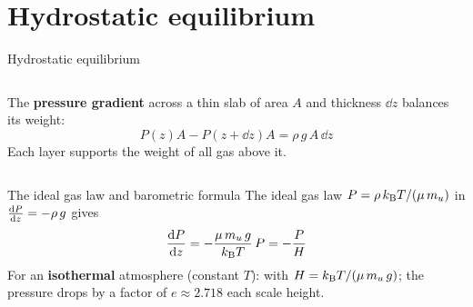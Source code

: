 \documentclass[aspectratio=169, 11pt]{beamer}
\begin{document}
\section{Hydrostatic equilibrium}

\begin{frame}{Hydrostatic equilibrium}
  \begin{columns}[c]
    \column{\recapfigcol}

    \column{\recaptextcol}
    \small
    The \textbf{pressure gradient} across a thin slab of area $A$ and thickness $\dd z$ balances its weight:
    $$P(z)A - P(z + \dd z)A = \rho\,g\,A\,\dd z$$
    \vskip4pt
    \vskip4pt
    Each layer supports the weight of all gas above it.
  \end{columns}
\end{frame}

\begin{frame}{The ideal gas law and barometric formula}
  The ideal gas law $P = \rho\,k_{\mathrm{B}} T / (\mu\,m_u)$ in $\frac{\mathrm{d} P}{\mathrm{d} z} = -\rho\,g$ gives
  $$\frac{\mathrm{d} P}{\mathrm{d} z} = -\frac{\mu\,m_u\,g}{k_{\mathrm{B}} T}\,P = -\frac{P}{H}$$
  \vskip4pt
  For an \textbf{isothermal} atmosphere (constant $T$):
  \vskip4pt
  \vskip4pt
  with $H = k_{\mathrm{B}} T/(\mu\,m_u\,g)$; the pressure drops by a factor of $e \approx 2.718$ each scale height.
\end{frame}

\begin{frame}
\end{frame}

\begin{frame}
\end{frame}
\end{document}
